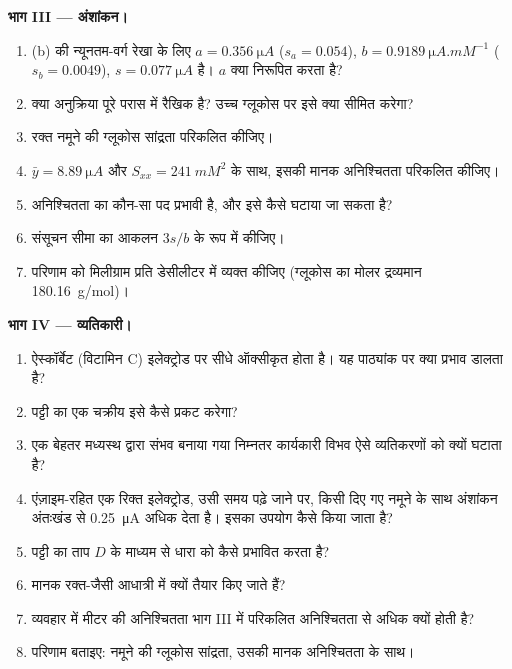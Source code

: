 \begin{problem}
\medskip\noindent\textbf{भाग III --- अंशांकन।}
\begin{enumerate}[resume]
  \item (b) की न्यूनतम-वर्ग रेखा के लिए $a = \qty{0.356}{\micro A}$ ($s_a = 0.054$), $b =
        \qty{0.9189}{\micro A.mM^{-1}}$ ($s_b = 0.0049$), $s = \qty{0.077}{\micro A}$ है। $a$ क्या निरूपित करता है?
  \item क्या अनुक्रिया पूरे परास में रैखिक है? उच्च ग्लूकोस पर इसे क्या
        सीमित करेगा?
  \item रक्त नमूने की ग्लूकोस सांद्रता परिकलित कीजिए।
  \item $\bar y = \qty{8.89}{\micro A}$ और $S_{xx} = \qty{241}{mM^2}$ के साथ, इसकी मानक अनिश्चितता परिकलित कीजिए।
  \item अनिश्चितता का कौन-सा पद प्रभावी है, और इसे कैसे घटाया जा सकता है?
  \item संसूचन सीमा का आकलन $3s/b$ के रूप में कीजिए।
  \item परिणाम को मिलीग्राम प्रति डेसीलीटर में व्यक्त कीजिए (ग्लूकोस का मोलर द्रव्यमान
        \qty{180.16}{g/mol})।
\end{enumerate}

\medskip\noindent\textbf{भाग IV --- व्यतिकारी।}
\begin{enumerate}[resume]
  \item ऐस्कॉर्बेट (विटामिन C) इलेक्ट्रोड पर सीधे ऑक्सीकृत होता है। यह पाठ्यांक पर
        क्या प्रभाव डालता है?
  \item पट्टी का एक चक्रीय  इसे कैसे प्रकट करेगा?
  \item एक बेहतर मध्यस्थ द्वारा संभव बनाया गया निम्नतर कार्यकारी विभव ऐसे व्यतिकरणों को
        क्यों घटाता है?
  \item एंज़ाइम-रहित एक रिक्त इलेक्ट्रोड, उसी समय पढ़े जाने पर, किसी दिए गए नमूने के साथ अंशांकन अंतःखंड से
        \qty{0.25}{\micro A} अधिक देता है। इसका उपयोग कैसे
        किया जाता है?
  \item पट्टी का ताप $D$ के माध्यम से धारा को कैसे प्रभावित करता है?
  \item मानक रक्त-जैसी आधात्री में क्यों तैयार किए जाते हैं?
  \item व्यवहार में मीटर की अनिश्चितता भाग III में परिकलित अनिश्चितता से
        अधिक क्यों होती है?
  \item परिणाम बताइए: नमूने की ग्लूकोस सांद्रता, उसकी
        मानक अनिश्चितता के साथ।
\end{enumerate}
\end{problem}

